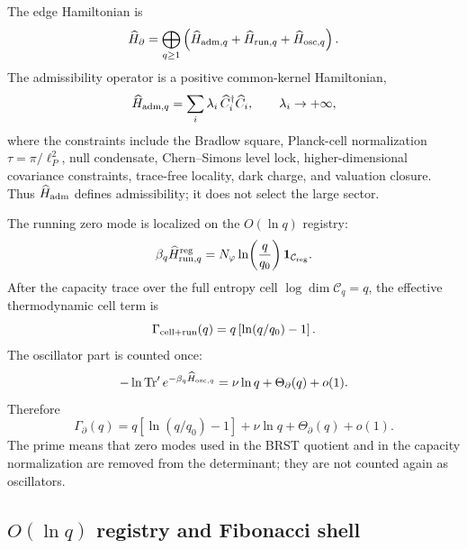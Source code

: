\documentclass[aps,prd,reprint,nofootinbib,superscriptaddress,floatfix]{revtex4-2}
\numberwithin{equation}{section}
\theoremstyle{definition}
\theoremstyle{plain}
\begin{document}
The edge Hamiltonian is
\[
\widehat H_\partial
=
\bigoplus_{q\ge1}
\left(
\widehat H_{{\rm adm},q}
+
\widehat H_{{\rm run},q}
+
\widehat H_{{\rm osc},q}
\right).
\]
The admissibility operator is a positive common-kernel Hamiltonian,
\[
\widehat H_{{\rm adm},q}
=
\sum_i \lambda_i\,\widehat C_i^\dagger\widehat C_i,\qquad
\lambda_i\rightarrow+\infty ,
\]
where the constraints include the Bradlow square, Planck-cell normalization
\(\tau=\pi/\ell_P^2\), null condensate, Chern--Simons level lock,
higher-dimensional covariance constraints, trace-free locality, dark charge,
and valuation closure.  Thus \(\widehat H_{\rm adm}\) defines admissibility;
it does not select the large sector.

The running zero mode is localized on the \(O(\ln q)\) registry:
\[
\beta_q\widehat H_{{\rm run},q}^{\rm reg}
=
N_\varphi
\ln\!\left(\frac{q}{q_0}\right)
\mathbf 1_{\mathcal C_{\rm reg}} .
\]
After the capacity trace over the full entropy cell
\(\log\dim\mathcal C_q=q\), the effective thermodynamic cell term is
\[
\Gamma_{\rm cell+run}(q)
=
q\left[\ln(q/q_0)-1\right].
\]
The oscillator part is counted once:
\[
-\ln\operatorname{Tr}'e^{-\beta_q\widehat H_{{\rm osc},q}}
=
\nu\ln q+\Theta_\partial(q)+o(1).
\]
Therefore
\[
\boxed{
\Gamma_\partial(q)
=
q\left[\ln(q/q_0)-1\right]
+\nu\ln q+\Theta_\partial(q)+o(1).
}
\]
The prime means that zero modes used in the BRST quotient and in the capacity
normalization are removed from the determinant; they are not counted again as
oscillators.

\subsection{\texorpdfstring{\(O(\ln q)\)}{O(log q)} registry and Fibonacci shell}
\end{document}

